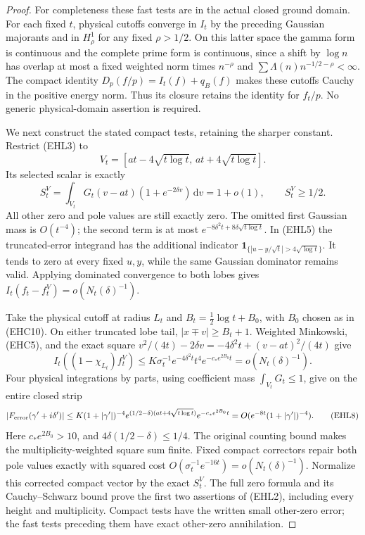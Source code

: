 \documentclass[11pt]{article}
\theoremstyle{remark}\newtheorem{remark}[theorem]{Remark}
\newcommand{\dd}{\,\mathrm d}
\begin{document}
\begin{proof}
For completeness these fast tests are in the actual closed
ground domain. For each fixed $t$, physical cutoffs converge
in $I_t$ by the preceding Gaussian majorants and in
$H^1_\rho$ for any fixed $\rho>1/2$.
On this latter space the gamma form is continuous and
the complete prime form is continuous, since a shift by
$\log n$ has overlap at most a fixed weighted norm times
$n^{-\rho}$ and
$\sum\Lambda(n)n^{-1/2-\rho}<\infty$.
The compact identity $D_p(f/p)=I_t(f)+q_B(f)$ makes
these cutoffs Cauchy in the positive energy norm.
Thus its closure retains the identity for $f_t/p$.
No generic physical-domain assertion is required.

We next construct the stated compact tests, retaining
the sharper constant. Restrict (EHL3) to
\[
 V_t=[at-4\sqrt{t\log t},\,at+4\sqrt{t\log t}].
\]
Its selected scalar is exactly
\[
 S_t^V=\int_{V_t}G_t(v-at)(1+e^{-2\delta v})\dd v
                    =1+o(1),\qquad S_t^V\ge1/2.          \tag{EHL6}
\]
All other zero and pole values are still exactly zero.
The omitted first Gaussian mass is $O(t^{-4})$; the second
term is at most
$e^{-8\delta^2t+8\delta\sqrt{t\log t}}$.
In (EHL5) the truncated-error integrand has the additional
indicator
$\boldsymbol1_{\{|u-y/\sqrt t|>4\sqrt{\log t}\}}$.
It tends to zero at every fixed $u,y$, while the same
Gaussian dominator remains valid. Applying dominated
convergence to both lobes gives
$I_t(f_t-f_t^V)=o(N_t(\delta)^{-1})$.

Take the physical cutoff at radius $L_t$ and
$B_t=\tfrac12\log t+B_0$, with $B_0$ chosen as in (EHC10).
On either truncated lobe tail, $|x\mp v|\ge B_t+1$.
Weighted Minkowski, (EHC5), and the exact square
$v^2/(4t)-2\delta v=-4\delta^2t+(v-at)^2/(4t)$ give
\[
 I_t((1-\chi_{L_t})f_t^V)
 \le K\sigma_t^{-1}e^{-4\delta^2t}t^4
                              e^{-c_*e^{2B_0}t}
 =o(N_t(\delta)^{-1}).                                \tag{EHL7}
\]
Four physical integrations by parts, using coefficient
mass $\int_{V_t}G_t\le1$, give on the entire closed strip
\[
 |F_{\rm error}(\gamma'+i\delta')|
 \le K(1+|\gamma'|)^{-4}
       e^{(1/2-\delta)(at+4\sqrt{t\log t})}
                              e^{-c_*e^{2B_0}t}
 =O(e^{-8t}(1+|\gamma'|)^{-4}).                         \tag{EHL8}
\]
Here $c_*e^{2B_0}>10$, and
$4\delta(1/2-\delta)\le1/4$.
The original counting bound makes the multiplicity-weighted
square sum finite. Fixed compact correctors repair both
pole values exactly with squared cost
$O(\sigma_t^{-1}e^{-16t})=o(N_t(\delta)^{-1})$.
Normalize this corrected compact vector by the exact $S_t^V$.
The full zero formula and its Cauchy--Schwarz bound prove
the first two assertions of (EHL2), including every height
and multiplicity. Compact tests have the written small
other-zero error; the fast tests preceding them have exact
other-zero annihilation.


\end{proof}
\end{document}
